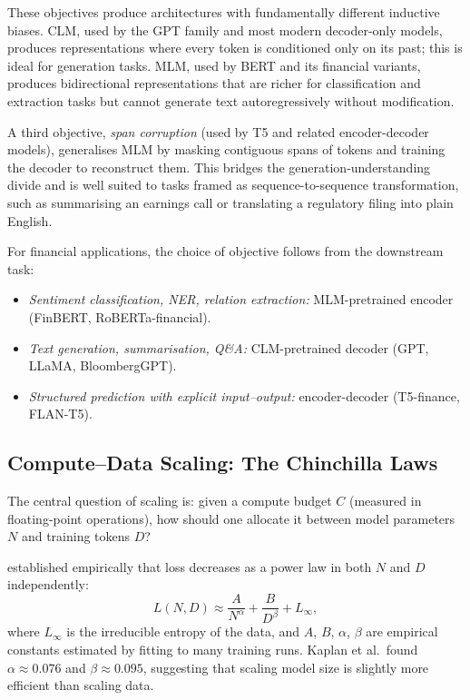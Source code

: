 \begin{deepdive}
These objectives produce architectures with fundamentally different inductive
biases.  CLM, used by the GPT family and most modern decoder-only models,
produces representations where every token is conditioned only on its past;
this is ideal for generation tasks.  MLM, used by BERT \cite{devlin2019}
and its financial variants, produces bidirectional representations that are
richer for classification and extraction tasks but cannot generate text
autoregressively without modification.

A third objective, \emph{span corruption} (used by T5 and related encoder-decoder
models), generalises MLM by masking contiguous spans of tokens and training the
decoder to reconstruct them.  This bridges the generation-understanding divide
and is well suited to tasks framed as sequence-to-sequence transformation,
such as summarising an earnings call or translating a regulatory filing into
plain English.

For financial applications, the choice of objective follows from the downstream task:
\begin{itemize}
  \item \emph{Sentiment classification, NER, relation extraction:} MLM-pretrained
        encoder (FinBERT, RoBERTa-financial).
  \item \emph{Text generation, summarisation, Q\&A:} CLM-pretrained decoder
        (GPT, LLaMA, BloombergGPT).
  \item \emph{Structured prediction with explicit input--output:} encoder-decoder
        (T5-finance, FLAN-T5).
\end{itemize}

\subsection{Compute--Data Scaling: The Chinchilla Laws}
\label{subsec:chinchilla}

The central question of scaling is: given a compute budget $C$ (measured in
floating-point operations), how should one allocate it between model parameters
$N$ and training tokens $D$?

\citet{kaplan2020scaling} established empirically that loss decreases as a power
law in both $N$ and $D$ independently:
\begin{equation}
  L(N, D) \approx \frac{A}{N^\alpha} + \frac{B}{D^\beta} + L_\infty,
  \label{eq:kaplan-loss}
\end{equation}
where $L_\infty$ is the irreducible entropy of the data, and $A$, $B$, $\alpha$,
$\beta$ are empirical constants estimated by fitting to many training runs.
Kaplan et al.\ found $\alpha \approx 0.076$ and $\beta \approx 0.095$, suggesting
that scaling model size is slightly more efficient than scaling data.


\end{deepdive}
